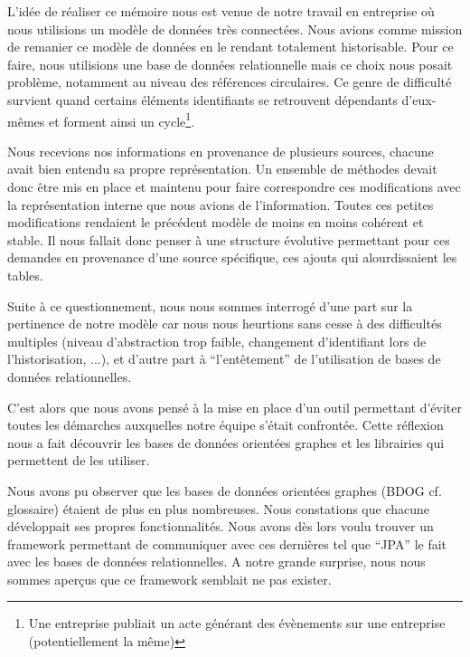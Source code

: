 \documentclass[a4paper,fleqn,12pt,oneside]{report}
\begin{document}
L'idée de réaliser ce mémoire nous est venue de notre travail en entreprise où nous utilisions un modèle de données très connectées. Nous avions comme mission de remanier ce modèle de données en le rendant totalement historisable. Pour ce faire, nous utilisions une base de données relationnelle mais ce choix nous posait problème, notamment au niveau des références circulaires. Ce genre de difficulté survient quand certains éléments identifiants se retrouvent dépendants d'eux-mêmes et forment ainsi un cycle\footnote{Une entreprise publiait un acte générant des évènements sur une entreprise (potentiellement la même)}. 

Nous recevions nos informations en provenance de plusieurs sources, chacune avait bien entendu sa propre représentation. Un ensemble de méthodes devait donc être mis en place et maintenu pour faire correspondre ces modifications avec la représentation interne que nous avions de l'information. Toutes ces petites modifications rendaient le précédent modèle de moins en moins cohérent et stable. Il nous fallait donc penser à une structure évolutive permettant pour ces demandes en provenance d’une source spécifique, ces ajouts qui alourdissaient les tables. 

Suite à ce questionnement, nous nous sommes interrogé d'une part sur la pertinence de notre modèle car nous nous heurtions sans cesse à des difficultés multiples (niveau d'abstraction trop faible, changement d'identifiant lors de l'historisation, ...), et d'autre part à \enquote{l'entêtement} de l'utilisation de bases de données relationnelles. 

C'est alors que nous avons pensé à la mise en place d'un outil permettant d'éviter toutes les démarches auxquelles notre équipe s'était confrontée. Cette réflexion nous a fait découvrir les bases de données orientées graphes et les librairies qui permettent de les utiliser.

Nous avons pu observer que les bases de données orientées graphes (BDOG cf. glossaire) étaient de plus en plus nombreuses. Nous constations que chacune développait ses propres fonctionnalités. Nous avons dès lors voulu trouver un framework permettant de communiquer avec ces dernières tel que \enquote{JPA} le fait avec les bases de données relationnelles. A notre grande surprise, nous nous sommes aperçus que ce framework semblait ne pas exister.
\end{document}
